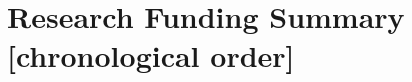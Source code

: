 \documentclass[11pt]{article}
\renewcommand\arraystretch{1}
\begin{document}
\begin{table}[!htbp]
\section*{Research Funding Summary \small{[chronological order]}}
\renewcommand\arraystretch{0.7}
  \centering

\end{table}
\end{document}
